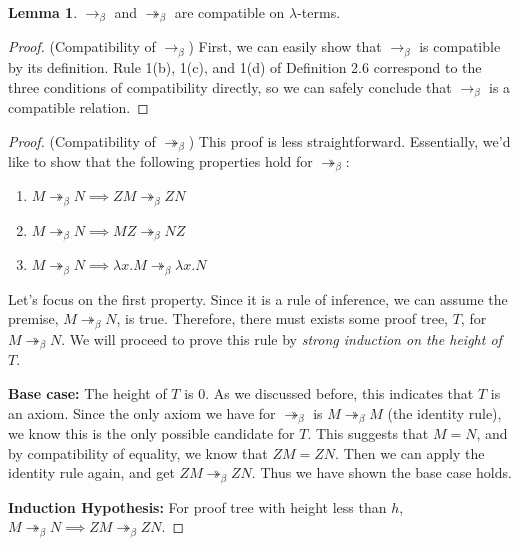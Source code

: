\documentclass[a4paper,11pt]{article}
\theoremstyle{definition}
\theoremstyle{example}
\theoremstyle{lemma}
\newtheorem{lemma}{Lemma}
\newcommand{\lamterm}[2]{\lambda #1. #2}
\newcommand{\ssbr}{\rightarrow_{\beta}}
\newcommand{\msbr}{\twoheadrightarrow_{\beta}}
\begin{document}
\begin{lemma}
$\ssbr$ and $\msbr$ are compatible on $\lambda$-terms.
\end{lemma}
\begin{proof}(Compatibility of $\ssbr$)
First, we can easily show that $\ssbr$ is compatible by its definition. Rule 1(b), 1(c), and 1(d) of Definition 2.6 correspond to the three conditions of compatibility directly, so we can safely conclude that $\ssbr$ is a compatible relation.
\end{proof}
\begin{proof}(Compatibility of $\msbr$)
This proof is less straightforward. Essentially, we'd like to show that the following properties hold for $\msbr$:
\begin{enumerate}[topsep=2pt,itemsep=-0.5ex,partopsep=1ex,parsep=1ex]
    \item $M \msbr N \implies ZM \msbr ZN$
    \item $M \msbr N \implies MZ \msbr NZ$
    \item $M \msbr N \implies \lamterm{x}{M} \msbr \lamterm{x}{N}$
\end{enumerate}
Let's focus on the first property. Since it is a rule of inference, we can assume the premise, $M \msbr N$, is true. Therefore, there must exists some proof tree, $T$, for $M \msbr N$. We will proceed to prove this rule by \textit{strong induction on the height of $T$}.

\textbf{Base case: }The height of $T$ is $0$. As we discussed before, this indicates that $T$ is an axiom. Since the only axiom we have for $\msbr$ is $M \msbr M$ (the identity rule), we know this is the only possible candidate for $T$. This suggests that $M = N$, and by compatibility of equality, we know that $ZM = ZN$. Then we can apply the identity rule again, and get $ZM \msbr ZN$. Thus we have shown the base case holds.

\textbf{Induction Hypothesis: }For proof tree with height less than $h$, $M \msbr N \implies ZM \msbr ZN$.


\end{proof}
\end{document}
